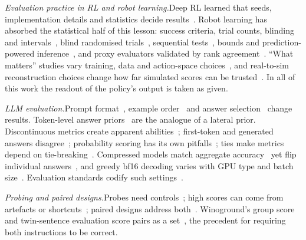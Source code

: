 \documentclass[conference]{IEEEtran}
\newcommand{\head}[1]{\textit{#1}\hspace{0.4em}}
\begin{document}
\head{Evaluation practice in RL and robot learning.}Deep RL learned that seeds, implementation details and statistics decide results~\cite{henderson2018deep,engstrom2020implementation,andrychowicz2021what,agarwal2021deep,colas2018how,jordan2020evaluating,patterson2024empirical}. Robot learning has absorbed the statistical half of this lesson: success criteria, trial counts, blinding and intervals~\cite{kressgazit2024robot}, blind randomised trials~\cite{barreiros2026careful}, sequential tests~\cite{snyder2025policy,snyder2026beyond}, bounds and prediction-powered inference~\cite{vincent2024generalizable,badithela2025reliable}, and proxy evaluators validated by rank agreement~\cite{kadian2020sim2real,li2024evaluating,atreya2025roboarena,zhou2025autoeval}. ``What matters'' studies vary training, data and action-space choices~\cite{mandlekar2021what,feng2026demystifying}, and real-to-sim reconstruction choices change how far simulated scores can be trusted~\cite{verma2026measuring}. In all of this work the readout of the policy's output is taken as given.

\head{LLM evaluation.}Prompt format~\cite{sclar2024quantifying,mizrahi2024state,polo2024efficient}, example order~\cite{lu2022fantastically} and answer selection~\cite{alzahrani2024benchmarks} change results. Token-level answer priors~\cite{zhao2021calibrate,zheng2024large} are the analogue of a lateral prior. Discontinuous metrics create apparent abilities~\cite{schaeffer2023emergent}; first-token and generated answers disagree~\cite{wang2024answer,wang2024look}; probability scoring has its own pitfalls~\cite{holtzman2021surface,hu2023prompting}; ties make metrics depend on tie-breaking~\cite{mcsherry2008computing}. Compressed models match aggregate accuracy~\cite{kurtic2025give} yet flip individual answers~\cite{dutta2024accuracy}, and greedy bf16 decoding varies with GPU type and batch size~\cite{yuan2025understanding,he2025defeating,atil2024nondeterminism}. Evaluation standards codify such settings~\cite{biderman2024lessons,gu2025olmes,liang2023holistic}.

\head{Probing and paired designs.}Probes need controls~\cite{hewitt2019designing,belinkov2022probing,ravichander2021probing}; high scores can come from artefacts or shortcuts~\cite{gururangan2018annotation,mccoy2019right,geirhos2020shortcut}; paired designs address both~\cite{goyal2017making,agrawal2018dont,gardner2020evaluating,kaushik2020learning}. Winoground's group score and twin-sentence evaluation score pairs as a set~\cite{thrush2022winoground,elazar2021back}, the precedent for requiring both instructions to be correct.
\end{document}
